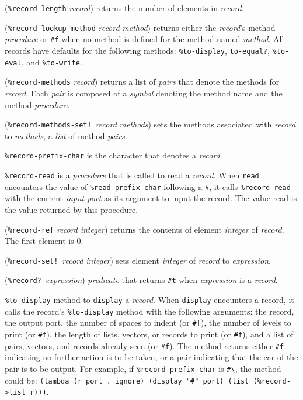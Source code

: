 \documentclass[10pt,twocolumn]{article}
\begin{document}
(\texttt{\%record-length} \emph{record}) returns the number of
elements in \emph{record}.

(\texttt{\%record-lookup-method} \emph{record} \emph{method}) returns
either the \emph{record}'s method \emph{procedure} or \texttt{\#f}
when no method is defined for the method named \emph{method}.  All
records have defaults for the following methods:
\texttt{\%to-display}, \texttt{to-equal?}, \texttt{\%to-eval}, and
\texttt{\%to-write}.

(\texttt{\%record-methods} \emph{record}) returns a list of
\emph{pairs} that denote the methods for \emph{record}.  Each
\emph{pair} is composed of a \emph{symbol} denoting the method name
and the method \emph{procedure}.

(\texttt{\%record-methods-set!}\ \emph{record} \emph{methods}) sets
the methods associated with \emph{record} to \emph{methods}, a
\emph{list} of method \emph{pairs}.

\texttt{\%record-prefix-char} is the character that denotes a
\emph{record}.

\texttt{\%record-read} is a \emph{procedure} that is called to read a
\emph{record}. When \texttt{read} encounters the value of
\texttt{\%read-prefix-char} following a \texttt{\#}, it calls
\texttt{\%record-read} with the current \emph{input-port} as its
argument to input the record.  The value read is the value returned by
this procedure.

(\texttt{\%record-ref} \emph{record} \emph{integer}) returns the
contents of element \emph{integer} of \emph{record}.  The first
element is 0.

(\texttt{\%record-set!}\ \emph{record} \emph{integer}) sets element
\emph{integer} of \emph{record} to \emph{expression}.

(\texttt{\%record?}\ \emph{expression}) \emph{predicate} that returns
\texttt{\#t} when \emph{expression} is a \emph{record}.

\texttt{\%to-display} method to \texttt{display} a \emph{record}.
When \texttt{display} encounters a record, it calls the record's
\texttt{\%to-display} method with the following arguments: the record,
the output port, the number of spaces to indent (or \texttt{\#f}), the
number of levels to print (or \texttt{\#f}), the length of lists,
vectors, or records to print (or \texttt{\#f}), and a list of pairs,
vectors, and records already seen (or \texttt{\#f}).  The method
returns either \texttt{\#f} indicating no further action is to be
taken, or a pair indicating that the car of the pair is to be output.
For example, if \texttt{\%record-prefix-char} is
\texttt{\#\textbackslash\texttildelow}, the method could be:
\texttt{(lambda (r port .\ ignore) (display "\#\texttildelow" port)
  (list (\%record->list r)))}.
\end{document}
